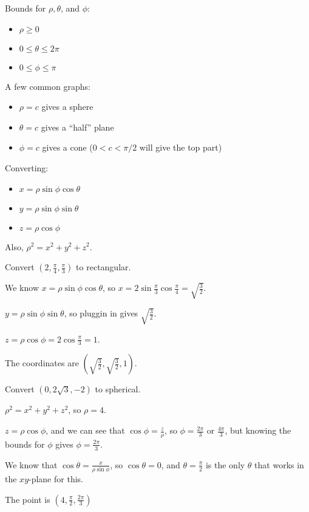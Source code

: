 \documentclass[../calc3.tex]{subfiles}
\begin{document}
Bounds for $\rho,\theta$, and $\phi$:
\begin{itemize}
    \item $\rho\geq 0$
    \item $0\leq \theta\leq 2\pi$
    \item $0\leq \phi\leq \pi$
\end{itemize}

A few common graphs:
\begin{itemize}
    \item $\rho = c$ gives a sphere 
    \item $\theta = c$ gives a ``half'' plane 
    \item $\phi = c$ gives a cone ($0<c<\pi/2$ will give the top part)
\end{itemize}

Converting:
\begin{itemize}
    \item $x=\rho \sin\phi \cos\theta$
    \item $y=\rho \sin\phi \sin\theta$
    \item $z=\rho \cos\phi$
\end{itemize}

Also, $\rho^2 = x^2+y^2+z^2$.

\begin{example}
    Convert $\left(2,\frac{\pi}{4},\frac{\pi}{3}\right)$ to rectangular.

    We know $x=\rho \sin\phi \cos\theta$, so $x=2\sin\frac{\pi}{3}\cos\frac{\pi}{4}=\sqrt{\frac{3}{2}}$.

    $y=\rho\sin\phi\sin\theta$, so pluggin in gives $\sqrt{\frac{3}{2}}$.

    $z=\rho\cos\phi = 2\cos\frac{\pi}{3}=1$.

    The coordinates are $\left(\sqrt{\frac{3}{2}},\sqrt{\frac{3}{2}}, 1\right)$.
\end{example}

\pagebreak
\begin{example}
    Convert $(0,2\sqrt{3},-2)$ to spherical.

    $\rho^2 = x^2+y^2+z^2$, so $\rho=4$.

    $z=\rho\cos\phi$, and we can see that $\cos\phi = \frac{z}{\rho}$, so $\phi = \frac{2\pi}{3}$ or $\frac{4\pi}{3}$, but knowing the bounds for $\phi$ gives $\phi = \frac{2\pi}{3}$.

    We know that $\cos\theta = \frac{x}{\rho\sin\phi}$, so $\cos\theta = 0$, and $\theta = \frac{\pi}{2}$ is the only $\theta$ that works in the $xy$-plane for this.

    The point is $\left(4,\frac{\pi}{2},\frac{2\pi}{3}\right)$
\end{example}
\end{document}
